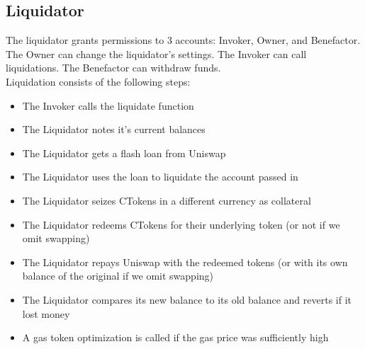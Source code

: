 \documentclass{article}
\begin{document}
  \subsection*{Liquidator}
  The liquidator grants permissions to 3 accounts: Invoker, Owner, and Benefactor.
  The Owner can change the liquidator's settings. The Invoker can call liquidations. The Benefactor can withdraw funds.
  \\
  Liquidation consists of the following steps:
  \begin{itemize}
    \item The Invoker calls the liquidate function
    \item The Liquidator notes it's current balances
    \item The Liquidator gets a flash loan from Uniswap
    \item The Liquidator uses the loan to liquidate the account passed in
    \item The Liquidator seizes CTokens in a different currency as collateral
    \item The Liquidator redeems CTokens for their underlying token (or not if we omit swapping)
    \item The Liquidator repays Uniswap with the redeemed tokens (or with its own balance of the original if we omit swapping)
    \item The Liquidator compares its new balance to its old balance and reverts if it lost money
    \item A gas token optimization is called if the gas price was sufficiently high
  \end{itemize}

  \pagebreak
\end{document}
